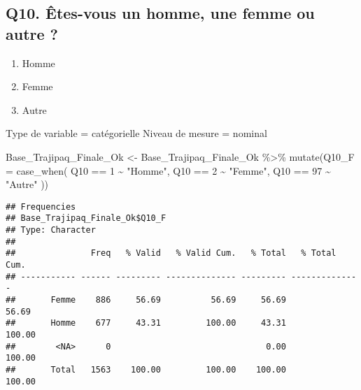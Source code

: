 \documentclass[
]{article}
\newenvironment{Shaded}{\begin{snugshade}}{\end{snugshade}}
\newcommand{\AttributeTok}[1]{\textcolor[rgb]{0.77,0.63,0.00}{#1}}
\newcommand{\DecValTok}[1]{\textcolor[rgb]{0.00,0.00,0.81}{#1}}
\newcommand{\FunctionTok}[1]{\textcolor[rgb]{0.00,0.00,0.00}{#1}}
\newcommand{\NormalTok}[1]{#1}
\newcommand{\OtherTok}[1]{\textcolor[rgb]{0.56,0.35,0.01}{#1}}
\newcommand{\SpecialCharTok}[1]{\textcolor[rgb]{0.00,0.00,0.00}{#1}}
\newcommand{\StringTok}[1]{\textcolor[rgb]{0.31,0.60,0.02}{#1}}
\providecommand{\tightlist}{%
  \setlength{\itemsep}{0pt}\setlength{\parskip}{0pt}}
\begin{document}
\hypertarget{q10.-uxeates-vous-un-homme-une-femme-ou-autre}{%
\subsection{Q10. Êtes-vous un homme, une femme ou autre
?}\label{q10.-uxeates-vous-un-homme-une-femme-ou-autre}}

\begin{enumerate}
\def\labelenumi{\arabic{enumi}.}
\tightlist
\item
  Homme
\item
  Femme
\item
  Autre
\end{enumerate}

Type de variable = catégorielle Niveau de mesure = nominal

\begin{Shaded}
\begin{Highlighting}[]
\NormalTok{Base\_Trajipaq\_Finale\_Ok }\OtherTok{\textless{}{-}}
\NormalTok{  Base\_Trajipaq\_Finale\_Ok }\SpecialCharTok{\%\textgreater{}\%}
  \FunctionTok{mutate}\NormalTok{(}\AttributeTok{Q10\_F =} \FunctionTok{case\_when}\NormalTok{(}
\NormalTok{    Q10 }\SpecialCharTok{==} \DecValTok{1} \SpecialCharTok{\textasciitilde{}} \StringTok{"Homme"}\NormalTok{,}
\NormalTok{    Q10 }\SpecialCharTok{==} \DecValTok{2} \SpecialCharTok{\textasciitilde{}} \StringTok{"Femme"}\NormalTok{,}
\NormalTok{    Q10 }\SpecialCharTok{==} \DecValTok{97} \SpecialCharTok{\textasciitilde{}} \StringTok{"Autre"}
\NormalTok{  ))}
\end{Highlighting}
\end{Shaded}

\begin{Shaded}
\end{Shaded}

\begin{verbatim}
## Frequencies  
## Base_Trajipaq_Finale_Ok$Q10_F  
## Type: Character  
## 
##               Freq   % Valid   % Valid Cum.   % Total   % Total Cum.
## ----------- ------ --------- -------------- --------- --------------
##       Femme    886     56.69          56.69     56.69          56.69
##       Homme    677     43.31         100.00     43.31         100.00
##        <NA>      0                               0.00         100.00
##       Total   1563    100.00         100.00    100.00         100.00
\end{verbatim}
\end{document}
